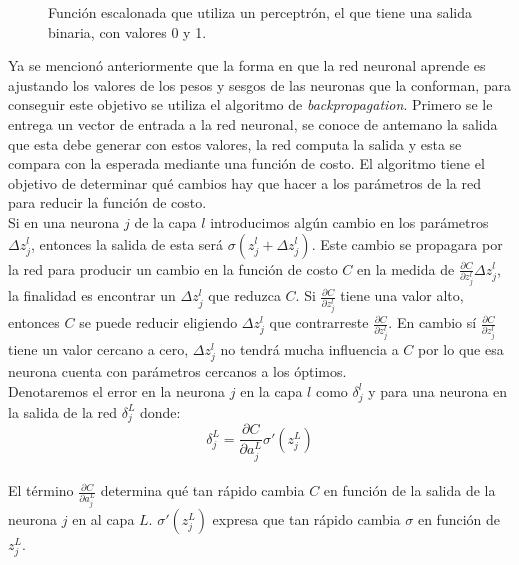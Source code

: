 \documentclass{iccmemoria}
\begin{document}
\begin{figure}[H]
  \centering
  \begin{small}
  
  \end{small}
  \caption[Función escalonada.]{Función escalonada que utiliza un perceptrón, el que tiene una salida binaria, con valores 0 y 1.}
  \label{fig:step}
\end{figure}

Ya se mencionó anteriormente que la forma en que la red neuronal aprende es ajustando los valores de los pesos y sesgos de las neuronas que la conforman, para conseguir este objetivo se utiliza el algoritmo de \emph{backpropagation}. Primero se le entrega un vector de entrada a la red neuronal, se conoce de antemano la salida que esta debe generar con estos valores, la red computa la salida y esta se compara con la esperada mediante una función de costo. El algoritmo tiene el objetivo de determinar qué cambios hay que hacer a los parámetros de la red para reducir la función de costo.\\

Si en una neurona $j$ de la capa $l$ introducimos algún cambio en los parámetros $\Delta z^l_j$, entonces la salida de esta será $\sigma(z^l_j + \Delta z^l_j)$. Este cambio se propagara por la red para producir un cambio en la función de costo $C$ en la medida de $\frac{\partial C}{\partial z^l_j} \Delta z^l_j$, la finalidad es encontrar un $\Delta z^l_j$ que reduzca $C$. Si $\frac{\partial C}{\partial z^l_j}$ tiene una valor alto, entonces $C$ se puede reducir eligiendo $\Delta z^l_j$ que contrarreste $\frac{\partial C}{\partial z^l_j}$. En cambio sí $\frac{\partial C}{\partial z^l_j}$ tiene un valor cercano a cero, $\Delta z^l_j$ no tendrá mucha influencia a $C$ por lo que esa neurona cuenta con parámetros cercanos a los óptimos.\\

Denotaremos el error en la neurona $j$ en la capa $l$ como $\delta^l_j$ y para una neurona en la salida de la red $\delta^L_j$ donde:\\

\begin{equation}
	\delta^L_j = \frac{\partial C}{\partial a^L_j} \sigma'(z^L_j)
\end{equation}\\

El término $\frac{\partial C}{\partial a^L_j}$ determina qué tan rápido cambia $C$ en función de la salida de la neurona $j$ en al capa $L$. $\sigma'(z^L_j)$ expresa que tan rápido cambia $\sigma$ en función de $z^L_j$.\\
 
\end{document}
